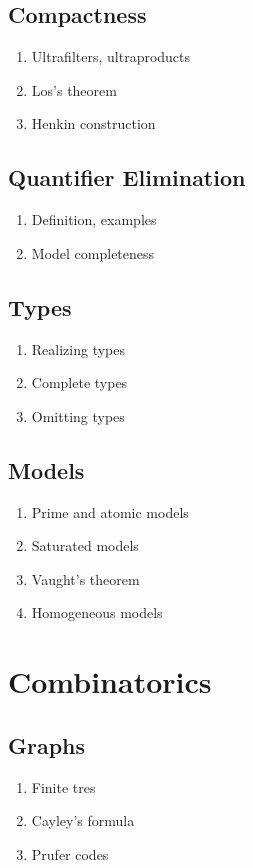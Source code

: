 \documentclass{article}
\begin{document}
\subsection{Compactness} 
\begin{enumerate}
  \item Ultrafilters, ultraproducts
  \item Los's theorem
  \item Henkin construction
\end{enumerate}

\subsection{Quantifier Elimination} 
\begin{enumerate}
  \item Definition, examples
  \item Model completeness
\end{enumerate}

\subsection{Types} 
\begin{enumerate}
  \item Realizing types
  \item Complete types
  \item Omitting types
\end{enumerate}

\subsection{Models} 
\begin{enumerate}
  \item Prime and atomic models
  \item Saturated models
  \item Vaught's theorem
  \item Homogeneous models
\end{enumerate}

\section{Combinatorics}
\subsection{Graphs}
  \begin{enumerate}
    \item Finite tres
    \item Cayley's formula
    \item Prufer codes
  \end{enumerate}
\end{document}
